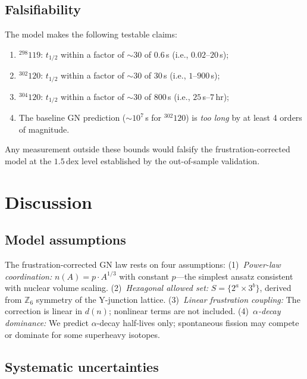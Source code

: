 \documentclass[aps,prc,twocolumn,showpacs,preprintnumbers,amsmath,amssymb]{revtex4-2}
\newcommand{\thalf}{t_{1/2}}
\newcommand{\dn}{d(n)}
\begin{document}
\subsection{Falsifiability}

The model makes the following testable claims:
\begin{enumerate}
\item ${}^{298}119$: $\thalf$ within a factor of $\sim 30$
  of $0.6$\,s (i.e., $0.02$--$20$\,s);
\item ${}^{302}120$: $\thalf$ within a factor of $\sim 30$
  of $30$\,s (i.e., $1$--$900$\,s);
\item ${}^{304}120$: $\thalf$ within a factor of $\sim 30$
  of $800$\,s (i.e., $25$\,s--$7$\,hr);
\item The baseline GN prediction ($\sim 10^7$\,s for
  ${}^{302}120$) is \emph{too long} by at least 4 orders
  of magnitude.
\end{enumerate}
Any measurement outside these bounds would falsify the
frustration-corrected model at the $1.5$\,dex level
established by the out-of-sample validation.

\section{Discussion}
\label{sec:discussion}

\subsection{Model assumptions}

The frustration-corrected GN law rests on four assumptions:
(1)~\emph{Power-law coordination:} $n(A) = p \cdot A^{1/3}$
  with constant $p$---the simplest ansatz consistent
  with nuclear volume scaling.
(2)~\emph{Hexagonal allowed set:} $S = \{2^a \times 3^b\}$,
  derived from $\mathbb{Z}_6$ symmetry of the
  Y-junction lattice.
(3)~\emph{Linear frustration coupling:} The correction is
  linear in $\dn$; nonlinear terms are not included.
(4)~\emph{$\alpha$-decay dominance:} We predict
  $\alpha$-decay half-lives only; spontaneous fission
  may compete or dominate for some superheavy isotopes.

\subsection{Systematic uncertainties}
\end{document}
